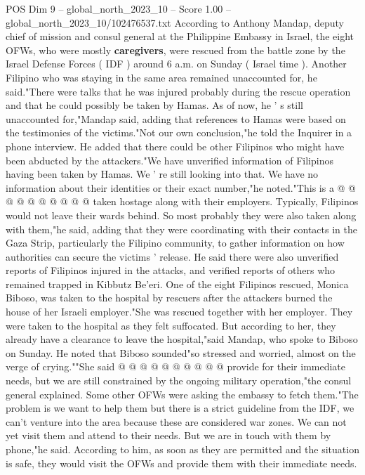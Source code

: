 \begin{textsample}{POS Dim 9 – global\_north\_2023\_10 – Score 1.00 – global\_north\_2023\_10/102476537.txt}  \label{ex:f9_pos_309}
According to Anthony Mandap, deputy chief of mission and consul general at the Philippine Embassy in Israel, the eight OFWs, who were mostly \textbf{caregivers}, were rescued from the battle zone by the Israel Defense Forces ( IDF ) around 6 a.m. on Sunday ( Israel time ).
Another Filipino who was staying in the same area remained unaccounted for, he said."There were talks that he was injured probably during the rescue operation and that he could possibly be taken by Hamas.
As of now, he ' s still unaccounted for,"Mandap said, adding that references to Hamas were based on the testimonies of the victims."Not our own conclusion,"he told the Inquirer in a phone interview.
He added that there could be other Filipinos who might have been abducted by the attackers."We have unverified information of Filipinos having been taken by Hamas.
We ' re still looking into that.
We have no information about their identities or their exact number,"he noted."This is a @ @ @ @ @ @ @ @ @ @ taken hostage along with their employers.
Typically, Filipinos would not leave their wards behind.
So most probably they were also taken along with them,"he said, adding that they were coordinating with their contacts in the Gaza Strip, particularly the Filipino community, to gather information on how authorities can secure the victims ' release.
He said there were also unverified reports of Filipinos injured in the attacks, and verified reports of others who remained trapped in Kibbutz Be'eri.
One of the eight Filipinos rescued, Monica Biboso, was taken to the hospital by rescuers after the attackers burned the house of her Israeli employer."She was rescued together with her employer.
They were taken to the hospital as they felt suffocated.
But according to her, they already have a clearance to leave the hospital,"said Mandap, who spoke to Biboso on Sunday.
He noted that Biboso sounded"so stressed and worried, almost on the verge of crying.""She said @ @ @ @ @ @ @ @ @ @ provide for their immediate needs, but we are still constrained by the ongoing military operation,"the consul general explained.
Some other OFWs were asking the embassy to fetch them."The problem is we want to help them but there is a strict guideline from the IDF, we can't venture into the area because these are considered war zones.
We can not yet visit them and attend to their needs.
But we are in touch with them by phone,"he said.
According to him, as soon as they are permitted and the situation is safe, they would visit the OFWs and provide them with their immediate needs.

\end{textsample}
